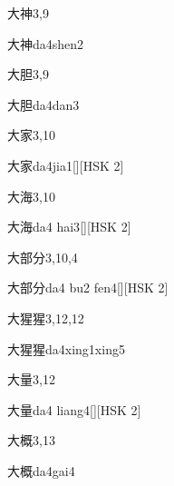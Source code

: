 \begin{entry}{大神}{3,9}
  \begin{phonetics}{大神}{da4shen2}
  \end{phonetics}
\end{entry}

\begin{entry}{大胆}{3,9}
  \begin{phonetics}{大胆}{da4dan3}
  \end{phonetics}
\end{entry}

\begin{entry}{大家}{3,10}
  \begin{phonetics}{大家}{da4jia1}[][HSK 2]
  \end{phonetics}
\end{entry}

\begin{entry}{大海}{3,10}
  \begin{phonetics}{大海}{da4 hai3}[][HSK 2]
  \end{phonetics}
\end{entry}

\begin{entry}{大部分}{3,10,4}
  \begin{phonetics}{大部分}{da4 bu2 fen4}[][HSK 2]
  \end{phonetics}
\end{entry}

\begin{entry}{大猩猩}{3,12,12}
  \begin{phonetics}{大猩猩}{da4xing1xing5}
  \end{phonetics}
\end{entry}

\begin{entry}{大量}{3,12}
  \begin{phonetics}{大量}{da4 liang4}[][HSK 2]
  \end{phonetics}
\end{entry}

\begin{entry}{大概}{3,13}
  \begin{phonetics}{大概}{da4gai4}
  \end{phonetics}
\end{entry}

